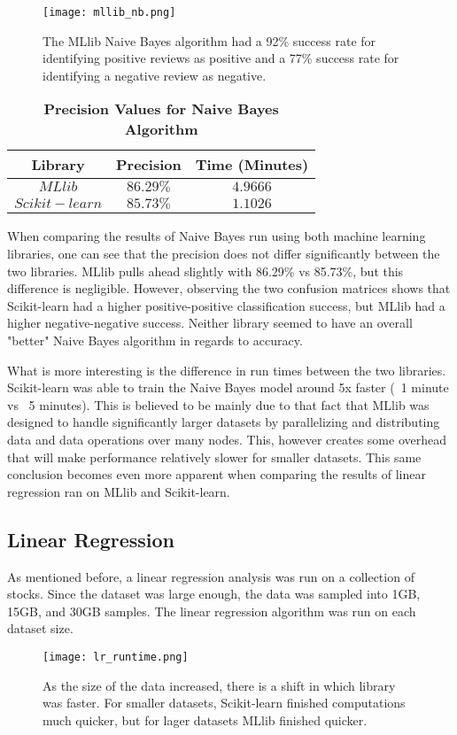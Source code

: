 \documentclass[9pt,twocolumn,twoside]{idsi}
\begin{document}
\begin{figure}[htbp]
\centering
\texttt{[image: mllib\_nb.png]}
\caption{The MLlib Naive Bayes algorithm had a 92\% success rate for identifying positive reviews as positive and a 77\% success rate for identifying a negative review as negative.}
\label{fig:nbmllib}
\end{figure}

\begin{table}[htbp]
\centering
\caption{\bf Precision Values for Naive Bayes Algorithm}
\begin{tabular}{ccc}
\hline
Library & Precision & Time (Minutes) \\
\hline
$MLlib$ & $86.29\%$ & $ 4.9666 $ \\ 
$Scikit-learn$ & $85.73\%$ & $ 1.1026 $ \\
\hline
\end{tabular}
  \label{tab:nb_precision}
\end{table}

When comparing the results of Naive Bayes run using both machine learning libraries, one can see that the precision does not differ significantly between the two libraries. MLlib pulls ahead slightly with 86.29\% vs 85.73\%, but this difference is negligible. However, observing the two confusion matrices shows that Scikit-learn had a higher positive-positive classification success, but MLlib had a higher negative-negative success. Neither library seemed to have an overall "better" Naive Bayes algorithm in regards to accuracy.

What is more interesting is the difference in run times between the two libraries. Scikit-learn was able to train the Naive Bayes model around 5x faster (~1 minute vs ~5 minutes). This is believed to be mainly due to that fact that MLlib was designed to handle significantly larger datasets by parallelizing and distributing data and data operations over many nodes. This, however creates some overhead that will make performance relatively slower for smaller datasets. This same conclusion becomes even more apparent when comparing the results of linear regression ran on MLlib and Scikit-learn. 

\subsection{Linear Regression}
As mentioned before, a linear regression analysis was run on a collection of stocks. Since the dataset was large enough, the data was sampled into 1GB, 15GB, and 30GB samples. The linear regression algorithm was run on each dataset size.
\begin{figure}[htbp]
\centering
\texttt{[image: lr\_runtime.png]}
\caption{As the size of the data increased, there is a shift in which library was faster. For smaller datasets, Scikit-learn finished computations much quicker, but for lager datasets MLlib finished quicker.}
\label{fig:linreg_runtime}
\end{figure}
\end{document}
